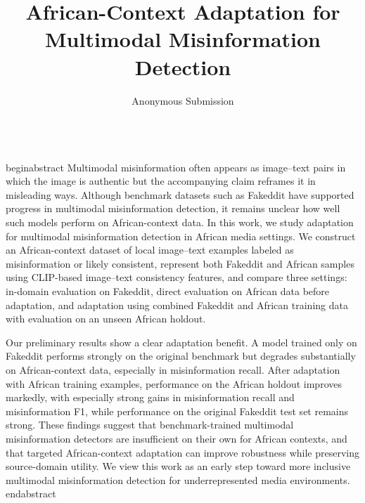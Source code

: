 \documentclass{article}
\title{African-Context Adaptation for Multimodal Misinformation Detection}
\author{Anonymous Submission}
\begin{document}
\maketitle

\\begin{abstract}
Multimodal misinformation often appears as image--text pairs in which the image is authentic but the accompanying claim reframes it in misleading ways. Although benchmark datasets such as Fakeddit have supported progress in multimodal misinformation detection, it remains unclear how well such models perform on African-context data. In this work, we study adaptation for multimodal misinformation detection in African media settings. We construct an African-context dataset of local image--text examples labeled as misinformation or likely consistent, represent both Fakeddit and African samples using CLIP-based image--text consistency features, and compare three settings: in-domain evaluation on Fakeddit, direct evaluation on African data before adaptation, and adaptation using combined Fakeddit and African training data with evaluation on an unseen African holdout.

Our preliminary results show a clear adaptation benefit. A model trained only on Fakeddit performs strongly on the original benchmark but degrades substantially on African-context data, especially in misinformation recall. After adaptation with African training examples, performance on the African holdout improves markedly, with especially strong gains in misinformation recall and misinformation F1, while performance on the original Fakeddit test set remains strong. These findings suggest that benchmark-trained multimodal misinformation detectors are insufficient on their own for African contexts, and that targeted African-context adaptation can improve robustness while preserving source-domain utility. We view this work as an early step toward more inclusive multimodal misinformation detection for underrepresented media environments.
\\end{abstract}
\end{document}
